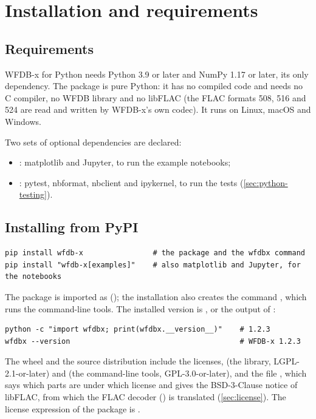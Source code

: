 \section{Installation and requirements}
\label{sec:python-install}

\subsection{Requirements}

WFDB-x for Python needs Python 3.9 or later and NumPy 1.17 or later, its only dependency.
The package is pure Python: it has no compiled code and needs no C compiler, no WFDB
library and no libFLAC (the FLAC formats 508, 516 and 524 are read and written by
WFDB-x's own codec). It runs on Linux, macOS and Windows.

Two sets of optional dependencies are declared:
\begin{itemize}
\item {}: matplotlib and Jupyter, to run the example notebooks;
\item {}: pytest, nbformat, nbclient and ipykernel, to run the tests
  (\cref{sec:python-testing}).
\end{itemize}

\subsection{Installing from PyPI}

\begin{lstlisting}[style=shell]
pip install wfdb-x                # the package and the wfdbx command
pip install "wfdb-x[examples]"    # also matplotlib and Jupyter, for the notebooks
\end{lstlisting}

The package is imported as  (); the installation also
creates the command , which runs the command-line tools. The installed version
is , or the output of :

\begin{lstlisting}[style=shell]
python -c "import wfdbx; print(wfdbx.__version__)"    # 1.2.3
wfdbx --version                                       # WFDB-x 1.2.3
\end{lstlisting}

The wheel and the source distribution include the licenses,  (the library,
LGPL-2.1-or-later) and  (the command-line tools, GPL-3.0-or-later), and
the file , which says which parts are under which license and gives the
BSD-3-Clause notice of libFLAC, from which the FLAC decoder () is
translated (\cref{sec:license}). The license expression of the package is
.

